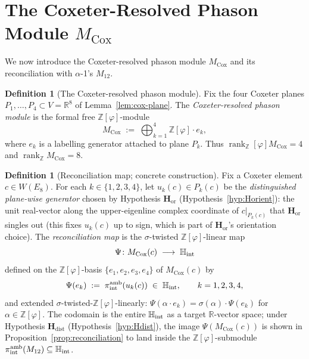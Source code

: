 \documentclass[11pt, a4paper]{amsart}
\theoremstyle{definition}
\newtheorem{definition}[theorem]{Definition}
\newcommand{\R}{\mathbb{R}}
\newcommand{\Z}{\mathbb{Z}}
\newcommand{\HH}{\mathbb{H}}
\newcommand{\rk}{\operatorname{rank}}
\newcommand{\Hor}{\mathbf{H}_{\mathrm{or}}}
\newcommand{\Hdist}{\mathbf{H}_{\mathrm{dist}}}
\newcommand{\Ophi}{\mathbb{Z}[\varphi]}
\newcommand{\Mcox}{M_{\mathrm{Cox}}}
\newcommand{\Mtw}{M_{12}}
\begin{document}
\section{The Coxeter-Resolved Phason Module $\Mcox$}
\label{sec:Mcox}

We now introduce the Coxeter-resolved phason module $\Mcox$
and its reconciliation with $\alpha$-1's $\Mtw$.

\begin{definition}[The Coxeter-resolved phason module]
\label{def:Mcox}
Fix the four Coxeter planes $P_1, \ldots, P_4 \subset V =
\R^8$ of Lemma~\ref{lem:cox-plane}. The
\emph{Coxeter-resolved phason module} is the formal free
$\Ophi$-module
\[
  \Mcox \;:=\; \bigoplus_{k=1}^{4} \Ophi \cdot e_k,
\]
where $e_k$ is a labelling generator attached to plane $P_k$.
Thus $\rk_\Ophi \Mcox = 4$ and $\rk_\Z \Mcox = 8$.
\end{definition}

\begin{definition}[Reconciliation map; concrete construction]
\label{def:reconciliation}
Fix a Coxeter element $c \in W(E_8)$. For each $k \in \{1,
2, 3, 4\}$, let $u_k(c) \in P_k(c)$ be the
\emph{distinguished plane-wise generator} chosen by
Hypothesis $\Hor$ (Hypothesis~\ref{hyp:Horient}): the unit
real-vector along the upper-eigenline complex coordinate of
$c|_{P_k(c)}$ that $\Hor$ singles out (this fixes $u_k(c)$
up to sign, which is part of $\Hor$'s orientation choice).
The \emph{reconciliation map} is the $\sigma$-twisted
$\Ophi$-linear map
\[
  \Psi \colon \Mcox(c) \;\longrightarrow\; \HH_{\rm int}
\]
defined on the $\Ophi$-basis $\{e_1, e_2, e_3, e_4\}$ of
$\Mcox(c)$ by
\[
  \Psi(e_k) \;:=\; \pi_{\rm int}^{\rm amb}(u_k(c))
    \;\in\; \HH_{\rm int}, \qquad k = 1, 2, 3, 4,
\]
and extended $\sigma$-twisted-$\Ophi$-linearly:
$\Psi(\alpha \cdot e_k) = \sigma(\alpha) \cdot \Psi(e_k)$
for $\alpha \in \Ophi$. The codomain is the entire
$\HH_{\rm int}$ as a target $\R$-vector space; under
Hypothesis $\Hdist$ (Hypothesis~\ref{hyp:Hdist}), the image
$\Psi(\Mcox(c))$ is shown in
Proposition~\ref{prop:reconciliation} to land inside the
$\Ophi$-submodule $\pi_{\rm int}^{\rm amb}(\Mtw) \subseteq
\HH_{\rm int}$.
\end{definition}
\end{document}
